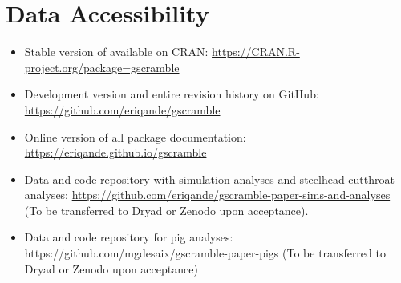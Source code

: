 \section*{Data Accessibility}

\begin{itemize}
\item Stable version of \gscramble{} available on CRAN: \url{https://CRAN.R-project.org/package=gscramble}
\item Development version and entire revision history on GitHub: \url{https://github.com/eriqande/gscramble}
\item Online version of all package documentation: \url{https://eriqande.github.io/gscramble}
\item Data and code repository with simulation analyses and steelhead-cutthroat analyses: \url{https://github.com/eriqande/gscramble-paper-sims-and-analyses} (To be transferred to Dryad or Zenodo upon acceptance).
\item Data and code repository for pig analyses: {https://github.com/mgdesaix/gscramble-paper-pigs} (To be transferred to Dryad or Zenodo upon acceptance)
\end{itemize}
\mbox{}

